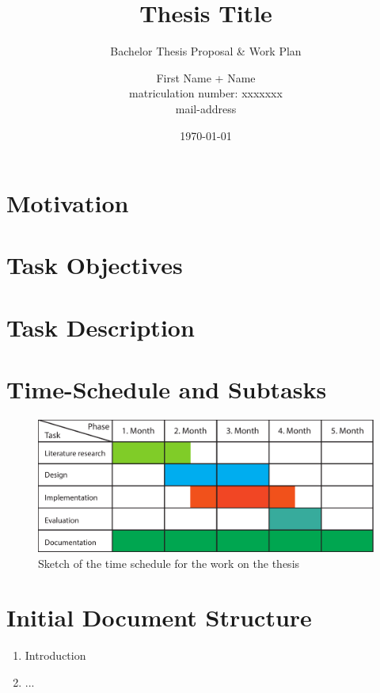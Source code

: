 \documentclass[12pt]{scrartcl}
\begin{document}
\title{Thesis Title}
\subtitle{Bachelor Thesis Proposal \& Work Plan}
\author{First Name + Name\\ \small{matriculation number: xxxxxxx}\\ \small{mail-address}}
\date{\today}
\maketitle

\section{Motivation}\label{sec:motivation}

\section{Task Objectives}\label{sec:task-objectives}

\section{Task Description}\label{sec:task-description}

\section{Time-Schedule and Subtasks}\label{sec:schedule-and-subtasks}

\begin{figure}[!ht]
	\centering
	\includegraphics[width=.9\textwidth]{timeschedule}
	\caption{Sketch of the time schedule for the work on the thesis}
	\label{fig:time-schedule}
\end{figure}
\section{Initial Document Structure}\label{sec:doc-structure}
\begin{enumerate}
	\item Introduction
	\item ...
\end{enumerate}
\newpage


\end{document}
